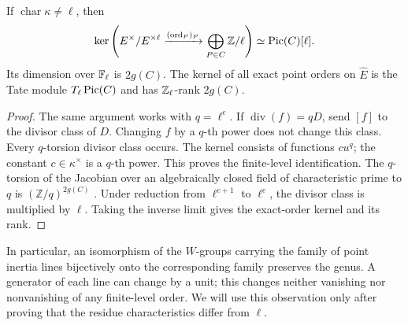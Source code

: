 \begin{lemma}\label{prelim:curve-kernel}
If $\operatorname{char}\kappa\ne\ell$, then
\[
 \ker\left(E^\times/E^{\times\ell}
       \xrightarrow{(\operatorname{ord}_P)_P}\bigoplus_{P\in C}\mathbb Z/\ell\right)
 \simeq\operatorname{Pic}(C)[\ell].
\]
Its dimension over $\mathbb F_\ell$ is $2g(C)$.  The kernel of all exact point
orders on $\widehat E$ is the Tate module $T_\ell\operatorname{Pic}(C)$ and has
$\mathbb Z_\ell$-rank $2g(C)$.
\end{lemma}
\begin{proof}
The same argument works with $q=\ell^e$.  If
$\operatorname{div}(f)=qD$, send $[f]$ to the divisor class of $D$.
Changing $f$ by a $q$-th power does not change this class.  Every
$q$-torsion divisor class occurs.  The kernel consists of functions
$cu^q$; the constant $c\in\kappa^\times$ is a $q$-th power.  This
proves the finite-level identification.  The $q$-torsion of the
Jacobian over an algebraically closed field of characteristic prime to
$q$ is $(\mathbb Z/q)^{2g(C)}$
\cite[Tag~0C1Z, Lemma~53.17.1]{Stacks}.  Under reduction from $\ell^{e+1}$
to $\ell^e$, the divisor class is multiplied by $\ell$.  Taking the
inverse limit gives the exact-order kernel and its rank.
\end{proof}

In particular, an isomorphism of the $W$-groups carrying the family of
point inertia lines bijectively onto the corresponding family preserves
the genus.  A generator
of each line can change by a unit; this changes neither vanishing nor
nonvanishing of any finite-level order.  We will use this observation
only after proving that the residue characteristics differ from $\ell$.
